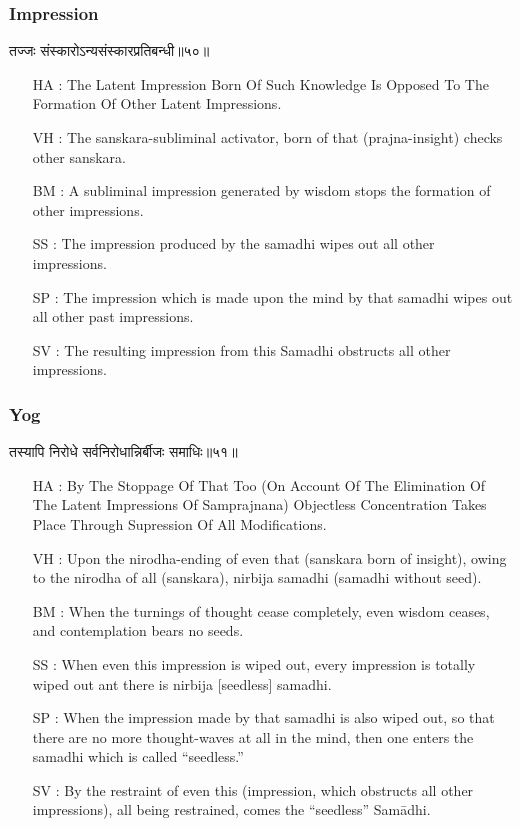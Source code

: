 \begin{frame}[fragile]\frametitle{Impression}
\begin{sanskrit}
तज्जः संस्कारोऽन्यसंस्कारप्रतिबन्धी॥५०॥
\end{sanskrit}

	\begin{itemize}
	\item [HA]: The Latent Impression Born Of Such Knowledge Is Opposed To The Formation Of Other Latent Impressions.
	\item [VH]: The sanskara-subliminal activator, born of that (prajna-insight) checks other sanskara.
	\item [BM]: A subliminal impression generated by wisdom stops the formation of other impressions.
	\item [SS]: The impression produced by the samadhi wipes out all other impressions.
	\item [SP]: The impression which is made upon the mind by that samadhi wipes out all other past impressions.
	\item [SV]: The resulting impression from this Samadhi obstructs all other impressions. 
	\end{itemize}
\end{frame}


\begin{frame}[fragile]\frametitle{Yog}
\begin{sanskrit}
तस्यापि निरोधे सर्वनिरोधान्निर्बीजः समाधिः॥५१॥
\end{sanskrit}

	\begin{itemize}
	\item [HA]: By The Stoppage Of That Too (On Account Of The Elimination Of The Latent Impressions Of Samprajnana) Objectless Concentration Takes Place Through Supression Of All Modifications.
	\item [VH]: Upon the nirodha-ending of even that (sanskara born of insight), owing to the nirodha of all (sanskara), nirbija samadhi (samadhi without seed).
	\item [BM]: When the turnings of thought cease completely, even wisdom ceases, and contemplation bears no seeds.
	\item [SS]: When even this impression is wiped out, every impression is totally wiped out ant there is nirbija [seedless] samadhi.
	\item [SP]: When the impression made by that samadhi is also wiped out, so that there are no more thought-waves at all in the mind, then one enters the samadhi which is called “seedless.”
	\item [SV]: By the restraint of even this (impression, which obstructs all other impressions), all being restrained, comes the “seedless” Samādhi. 
	\end{itemize}
\end{frame}

